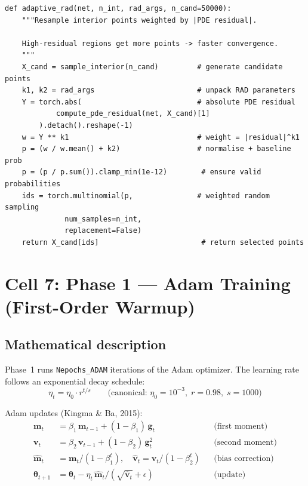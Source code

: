 \documentclass[11pt,a4paper]{article}
\begin{document}
\begin{lstlisting}
def adaptive_rad(net, n_int, rad_args, n_cand=50000):
    """Resample interior points weighted by |PDE residual|.

    High-residual regions get more points -> faster convergence.
    """
    X_cand = sample_interior(n_cand)         # generate candidate points
    k1, k2 = rad_args                        # unpack RAD parameters
    Y = torch.abs(                           # absolute PDE residual
            compute_pde_residual(net, X_cand)[1]
        ).detach().reshape(-1)
    w = Y ** k1                              # weight = |residual|^k1
    p = (w / w.mean() + k2)                  # normalise + baseline prob
    p = (p / p.sum()).clamp_min(1e-12)        # ensure valid probabilities
    ids = torch.multinomial(p,               # weighted random sampling
              num_samples=n_int,
              replacement=False)
    return X_cand[ids]                        # return selected points
\end{lstlisting}


\section{Cell 7: Phase 1 --- Adam Training (First-Order Warmup)}
\label{sec:adam}

\subsection*{Mathematical description}

Phase~1 runs \texttt{Nepochs\_ADAM} iterations of the Adam optimizer.
The learning rate follows an exponential decay schedule:
\begin{equation}
  \eta_t = \eta_0 \cdot r^{t/s}
  \qquad
  \text{(canonical: } \eta_0 = 10^{-3},\; r = 0.98,\; s = 1000\text{)}
\label{eq:lr_schedule}
\end{equation}

Adam updates (Kingma \& Ba, 2015):
\begin{align}
  \bm{m}_t &= \beta_1\,\bm{m}_{t-1} + (1\!-\!\beta_1)\,\bm{g}_t
    & &\text{(first moment)} \\
  \bm{v}_t &= \beta_2\,\bm{v}_{t-1} + (1\!-\!\beta_2)\,\bm{g}_t^2
    & &\text{(second moment)} \\
  \hat{\bm{m}}_t &= \bm{m}_t / (1\!-\!\beta_1^t),\quad
  \hat{\bm{v}}_t = \bm{v}_t / (1\!-\!\beta_2^t)
    & &\text{(bias correction)} \\
  \bm\theta_{t+1} &= \bm\theta_t
    - \eta_t\,\hat{\bm{m}}_t / (\sqrt{\hat{\bm{v}}_t} + \epsilon)
    & &\text{(update)}
\label{eq:adam}
\end{align}
\end{document}

